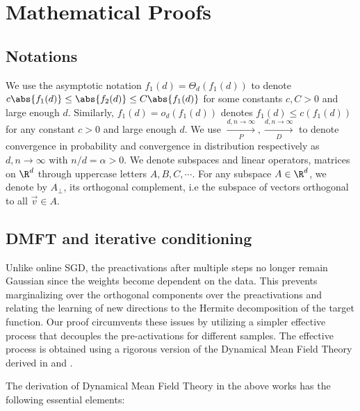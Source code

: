 \section{Mathematical Proofs}\label{2402:sec:app:proofs}

\subsection{Notations}
We use the asymptotic notation $f_1(d)=\Theta_d(f_1(d))$ to denote $c \abs{f_1(d)} \leq \abs{f_2(d)} \leq C \abs{f_1(d)}$ for some constants $c, C > 0$ and large enough $d$. Similarly, $f_1(d)=o_d(f_1(d))$ denotes
$f_1(d) \leq c(f_1(d))$ for any constant $c > 0$ and large enough $d$.
We use $\xrightarrow[P]{d,n \rightarrow \infty}, \xrightarrow[D]{d,n \rightarrow \infty}$ to denote convergence in probability and convergence in distribution respectively as $d,n \rightarrow \infty$ with $n/d=\alpha > 0$. We denote subspaces and linear operators, matrices on  $\R^d$ through uppercase letters $A,B,C,\cdots$. For any subspace $A \in \R^d$, we denote by $A_\perp$, its orthogonal complement, i.e the subspace of vectors orthogonal to all $\vec{v} \in A$.
\subsection{DMFT and iterative conditioning}\label{2402:sec:iterative}
Unlike online SGD, the preactivations after multiple steps no longer remain Gaussian since the weights become dependent on the data. This prevents marginalizing over the orthogonal components over the preactivations and relating the learning of new directions to the Hermite decomposition of the target function.
Our proof circumvents these issues by utilizing a simpler effective process that decouples the pre-activations for different samples. The effective process is obtained using a rigorous version of the Dynamical Mean Field Theory derived in \citep{montanari2022universality} and \citep{gerbelot2022rigorous}.

The derivation of Dynamical Mean Field Theory in the above works has the following essential elements:

